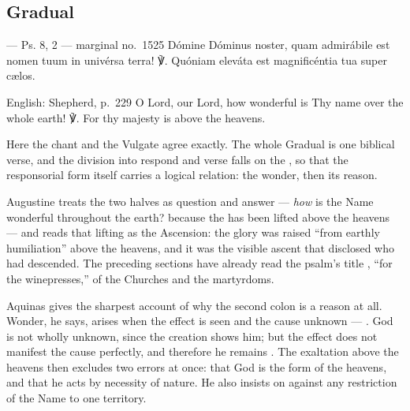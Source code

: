 \subsection*{Gradual }

\begin{appointedlatin}{ --- Ps. 8, 2 --- marginal no.\ 1525}
Dómine Dóminus noster, quam admirábile est nomen tuum in univérsa terra! ℣.
Quóniam eleváta est magnificéntia tua super cælos.
\end{appointedlatin}

\begin{namedtranslation}{English: Shepherd, p.~229}
O Lord, our Lord, how wonderful is Thy name over the whole earth! ℣. For thy
majesty is above the heavens.
\end{namedtranslation}

Here the chant and the Vulgate agree exactly. The whole Gradual is one
biblical verse, and the division into respond and verse falls on the
, so that the responsorial form itself carries a logical
relation: the wonder, then its reason.

\begin{witnessnote}
Augustine treats the two halves as question and answer --- \textit{how} is
the Name wonderful throughout the earth? because the  has
been lifted above the heavens --- and reads that lifting as the Ascension:
the glory was raised ``from earthly humiliation'' above the heavens, and it
was the visible ascent that disclosed who had descended. The preceding
sections have already read the psalm's title ,
``for the winepresses,'' of the Churches and the martyrdoms.
\end{witnessnote}

\begin{witnessnote}
Aquinas gives the sharpest account of why the second colon is a reason at all.
Wonder, he says, arises when the effect is seen and the cause unknown ---
. God is
not wholly unknown, since the creation shows him; but the effect does not
manifest the cause perfectly, and therefore he remains .
The exaltation above the heavens then excludes two errors at once: that God is
the form of the heavens, and that he acts by necessity of nature. He also
insists on  against any restriction of the Name to
one territory.
\end{witnessnote}

